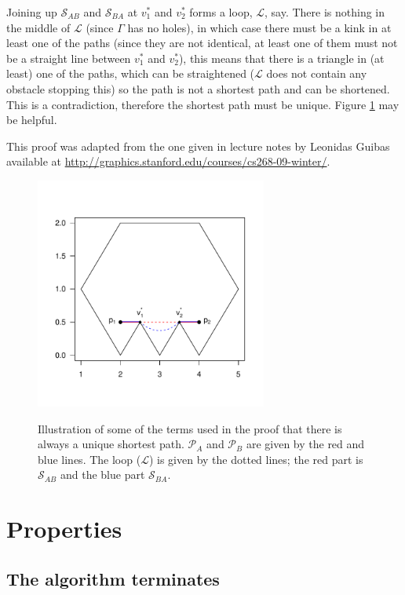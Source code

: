Joining up $\mathcal{S}_{AB}$ and $\mathcal{S}_{BA}$ at $v_1^*$ and $v_2^*$ forms a loop, $\mathcal{L}$, say. There is nothing in the middle of $\mathcal{L}$ (since $\Gamma$ has no holes), in which case there must be a kink in at least one of the paths (since they are not identical, at least one of them must not be a straight line between $v_1^*$ and $v_2^*$), this means that there is a triangle in (at least) one of the paths, which can be straightened ($\mathcal{L}$ does not contain any obstacle stopping this) so the path is not a shortest path and can be shortened. This is a contradiction, therefore the shortest path must be unique. Figure \ref{app-WAD-unique-dia} may be helpful.

This proof was adapted from the one given in lecture notes by Leonidas Guibas available at \url{http://graphics.stanford.edu/courses/cs268-09-winter/}.


\begin{figure}
\centering
\includegraphics[width=3in]{app-WAD/figs/unique-path-dia.pdf} \\
\caption{Illustration of some of the terms used in the proof that there is always a unique shortest path. $\mathcal{P}_A$ and  $\mathcal{P}_B$ are given by the red and blue lines. The loop ($\mathcal{L}$) is given by the dotted lines; the red part is  $\mathcal{S}_{AB}$ and the blue part  $\mathcal{S}_{BA}$.}
\label{app-WAD-unique-dia}
\end{figure}



\section{Properties}

\subsection{The algorithm terminates}


